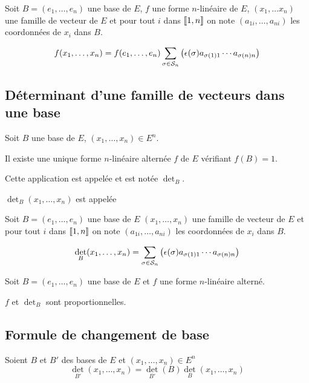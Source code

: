 \begin{cor}
  Soit $B = (e_1, \ldots, e_n)$ une base de $E$, $f$ une forme $n$-linéaire
  de $E$, $(x_1, \ldots x_n)$ une famille
  de vecteur de $E$ et pour tout $i$ dans $\llbracket 1, n \rrbracket$ on note
  $(a_{1 i}, \ldots, a_{n i})$ les coordonnées de $x_i$ dans $B$.

  \[
    f(x_1, \ldots, x_n) = f(e_1, \ldots, e_n) \sum_{\sigma \in \mathcal{S}_n} 
    \left(\epsilon(\sigma) a_{\sigma(1)1} \cdots a_{\sigma(n)n}\right) 
  \]
\end{cor}

\subsection{Déterminant d'une famille de vecteurs dans une base}

\begin{thm}
  Soit $B$ une base de $E$, $(x_1, \ldots, x_n) \in E^n$.
  
  Il existe une unique forme $n$-linéaire alternée $f$ de $E$ vérifiant
  $f(B) = 1$.

  Cette application est appelée  et est notée
  $\det_B$.

  $\det_B(x_1, \ldots, x_n)$ est appelée 
\end{thm}

\begin{cor}
  Soit $B = (e_1, \ldots, e_n)$ une base de $E$
  $(x_1, \ldots, x_n)$ une famille
  de vecteur de $E$ et pour tout $i$ dans $\llbracket 1, n \rrbracket$ on note
  $(a_{1 i}, \ldots, a_{n i})$ les coordonnées de $x_i$ dans $B$.

  \[
    \det_B(x_1, \ldots, x_n) = \sum_{\sigma \in \mathcal{S}_n} 
    \left(\epsilon(\sigma) a_{\sigma(1)1} \cdots a_{\sigma(n)n}\right) 
  \]
\end{cor}

\begin{prp}
  Soit $B = (e_1, \ldots, e_n)$ une base de $E$ et $f$ une forme $n$-linéaire alterné.

  $f$ et $\det_B$ sont proportionnelles.
\end{prp}

\subsection{Formule de changement de base}

\begin{prp}
  Soient $B$ et $B'$ des bases de $E$ et $(x_1, \ldots, x_n) \in E^n$
  \[
    \det_{B'}(x_1, \ldots, x_n) = \det_{B'}(B) \det_B(x_1, \ldots, x_n)
  \]
\end{prp}

